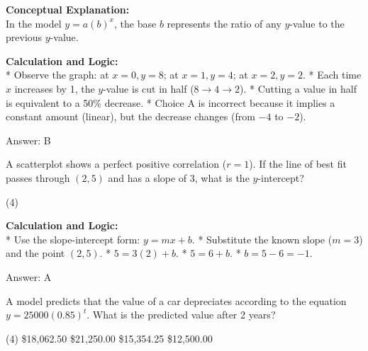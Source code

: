 \documentclass[11pt,paper=a4,answers]{exam}
\begin{document}
\begin{questions}
\begin{solution}
\textbf{Conceptual Explanation:} \\
In the model $y = a(b)^x$, the base $b$ represents the ratio of any $y$-value to the previous $y$-value.

\vspace{30pt}

\textbf{Calculation and Logic:} \\
* Observe the graph: at $x=0, y=8$; at $x=1, y=4$; at $x=2, y=2$.
* Each time $x$ increases by 1, the $y$-value is cut in half ($8 \rightarrow 4 \rightarrow 2$).
* Cutting a value in half is equivalent to a 50\% decrease.
* Choice A is incorrect because it implies a constant amount (linear), but the decrease changes (from $-4$ to $-2$).

\vspace{30pt}

Answer: \colorbox{yellow!100}{B}
\end{solution}

\vspace{60pt}

\question
A scatterplot shows a perfect positive correlation ($r = 1$). If the line of best fit passes through $(2, 5)$ and has a slope of 3, what is the $y$-intercept?
\begin{tasks}(4)
\end{tasks}

\begin{solution}
\textbf{Calculation and Logic:} \\
* Use the slope-intercept form: $y = mx + b$.
* Substitute the known slope ($m=3$) and the point $(2, 5)$.
* $5 = 3(2) + b$.
* $5 = 6 + b$.
* $b = 5 - 6 = -1$.

\vspace{30pt}

Answer: \colorbox{yellow!100}{A}
\end{solution}

\vspace{60pt}

\question
A model predicts that the value of a car depreciates according to the equation $y = 25000(0.85)^t$. What is the predicted value after 2 years?
\begin{tasks}(4)
    \task \$18,062.50
    \task \$21,250.00
    \task \$15,354.25
    \task \$12,500.00
\end{tasks}


\end{questions}
\end{document}
